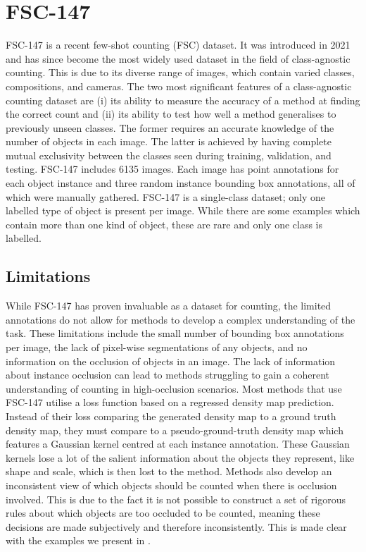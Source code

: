 \documentclass[../thesis.tex]{subfiles}
\begin{document}
\section{FSC-147}
FSC-147 \cite{ranjan2021Famnet} is a recent few-shot counting (FSC) dataset. It was introduced in 2021 and has since become the most widely used dataset in the field of class-agnostic counting.
This is due to its diverse range of images, which contain varied classes, compositions, and cameras.
The two most significant features of a class-agnostic counting dataset are (i) its ability to measure the accuracy of a method at finding the correct count and (ii) its ability to test how well a method generalises to previously unseen classes. 
The former requires an accurate knowledge of the number of objects in each image.
The latter is achieved by having complete mutual exclusivity between the classes seen during training, validation, and testing. 
FSC-147 includes 6135 images.
Each image has point annotations for each object instance and three random instance bounding box annotations, all of which were manually gathered. 
FSC-147 is a single-class dataset;  only one labelled type of object is present per image. 
While there are some examples which contain more than one kind of object, these are rare and only one class is labelled.

\subsection{Limitations}\label{sec__FSC133__limitations}
While FSC-147 has proven invaluable as a dataset for counting, the limited annotations do not allow for methods to develop a complex understanding of the task.
These limitations include the small number of bounding box annotations per image, the lack of pixel-wise segmentations of any objects, and no information on the occlusion of objects in an image.
The lack of information about instance occlusion can lead to methods struggling to gain a coherent understanding of counting in high-occlusion scenarios.
Most methods that use FSC-147 utilise a loss function based on a regressed density map prediction. 
Instead of their loss comparing the generated density map to a ground truth density map, they must compare to a pseudo-ground-truth density map which features a Gaussian kernel centred at each instance annotation. 
These Gaussian kernels lose a lot of the salient information about the objects they represent, like shape and scale, which is then lost to the method.
Methods also develop an inconsistent view of which objects should be counted when there is occlusion involved. 
This is due to the fact it is not possible to construct a set of rigorous rules about which objects are too occluded to be counted, meaning these decisions are made subjectively and therefore inconsistently.
This is made clear with the examples we present in .
\end{document}
